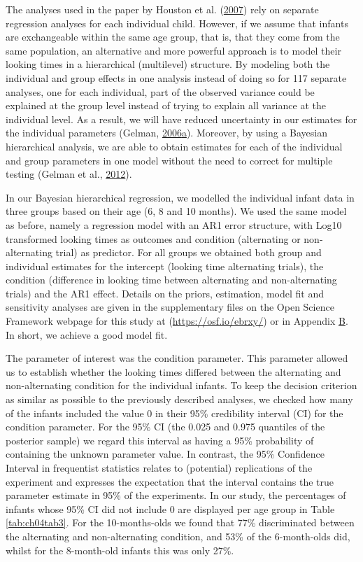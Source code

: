 \documentclass[openright,titlepage,12pt,a4paper]{book}
\begin{document}
The analyses used in the paper by Houston et al. (\protect\hyperlink{ref-houston_assessing_2007}{2007}) rely on separate regression analyses for each individual child. However, if we assume that infants are exchangeable within the same age group, that is, that they come from the same population, an alternative and more powerful approach is to model their looking times in a hierarchical (multilevel) structure. By modeling both the individual and group effects in one analysis instead of doing so for 117 separate analyses, one for each individual, part of the observed variance could be explained at the group level instead of trying to explain all variance at the individual level. As a result, we will have reduced uncertainty in our estimates for the individual parameters (Gelman, \protect\hyperlink{ref-gelman_multilevel_2006}{2006}\protect\hyperlink{ref-gelman_multilevel_2006}{a}). Moreover, by using a Bayesian hierarchical analysis, we are able to obtain estimates for each of the individual and group parameters in one model without the need to correct for multiple testing (Gelman et al., \protect\hyperlink{ref-gelman_why_2012}{2012}).

In our Bayesian hierarchical regression, we modelled the individual infant data in three groups based on their age (6, 8 and 10 months). We used the same model as before, namely a regression model with an AR1 error structure, with Log10 transformed looking times as outcomes and condition (alternating or non-alternating trial) as predictor. For all groups we obtained both group and individual estimates for the intercept (looking time alternating trials), the condition (difference in looking time between alternating and non-alternating trials) and the AR1 effect. Details on the priors, estimation, model fit and sensitivity analyses are given in the supplementary files on the Open Science Framework webpage for this study at (\url{https://osf.io/ebrxy/}) or in Appendix \protect\hyperlink{ch05appendixB}{B}. In short, we achieve a good model fit.

The parameter of interest was the condition parameter. This parameter allowed us to establish whether the looking times differed between the alternating and non-alternating condition for the individual infants. To keep the decision criterion as similar as possible to the previously described analyses, we checked how many of the infants included the value 0 in their 95\% credibility interval (CI) for the condition parameter. For the 95\% CI (the 0.025 and 0.975 quantiles of the posterior sample) we regard this interval as having a 95\% probability of containing the unknown parameter value. In contrast, the 95\% Confidence Interval in frequentist statistics relates to (potential) replications of the experiment and expresses the expectation that the interval contains the true parameter estimate in 95\% of the experiments. In our study, the percentages of infants whose 95\% CI did not include 0 are displayed per age group in Table \ref{tab:ch04tab3}. For the 10-months-olds we found that 77\% discriminated between the alternating and non-alternating condition, and 53\% of the 6-month-olds did, whilst for the 8-month-old infants this was only 27\%.
\end{document}
